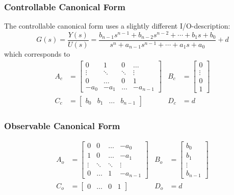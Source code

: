 \subsubsection{Controllable Canonical Form}
The controllable canonical form uses a slightly different I/O-description:
\[
    G(s) = \frac{Y(s)}{U(s)} = \frac{b_{n-1} s^{n-1} + b_{n-2} s^{n-2} +\cdots+b_{1} s 
    + b_{0}}{s^{n} + a_{n-1} s^{n-1} + \cdots + a_{1} s + a_{0}} + d
\]
which corresponds to
\begin{align*}
    A_c &= \begin{bmatrix}
        0 & 1 & 0 & \dots \\
        \vdots & \ddots & \ddots & \vdots \\
        0 & \dots & 0 & 1 \\
        -a_0 & -a_1 & \dots & -a_{n-1}
    \end{bmatrix} &
    B_c &= \begin{bmatrix}
        0 \\ \vdots \\ 0 \\ 1
    \end{bmatrix} \\
    C_c &= \begin{bmatrix}
        b_0 & b_1 & \dots & b_{n-1} 
    \end{bmatrix} &
    D_c &= d
\end{align*}

\subsubsection{Observable Canonical Form}
\begin{align*}
    A_o &= \begin{bmatrix}
        0 & 0 & \dots & -a_0 \\
        1 & 0 & \dots & -a_1 \\
        \vdots & \ddots & \ddots & \vdots \\
        0 & \dots & 1 & -a_{n-1}
    \end{bmatrix} &
    B_o &= \begin{bmatrix}
        b_0 \\ b_1 \\ \vdots \\ b_{n-1}
    \end{bmatrix} \\
    C_o &= \begin{bmatrix}
        0 & \dots & 0 & 1
    \end{bmatrix} & 
    D_o &= d
\end{align*}

